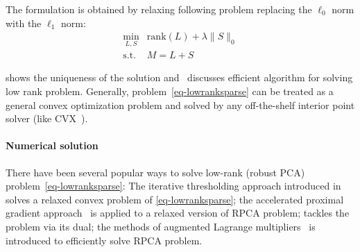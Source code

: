 The formulation is obtained by relaxing following problem replacing the $\ell_0$ norm with the $\ell_1$ norm:
\begin{equation}
\label{eq-lowrankorigin}
\begin{array}{cl}
\min_{L,S} & \mathrm{rank}(L) + \lambda \|S\|_0 \\
\mathrm{s.t.} & M = L+S
\end{array}
\end{equation}

\cite{candes2009exact,wright2009robust} shows the uniqueness of the solution and~\cite{lin2010augmented} discusses efficient algorithm for solving low rank problem.
Generally, problem~\ref{eq-lowranksparse} can be treated as a general convex optimization problem and solved by any off-the-shelf interior point solver (like CVX~\cite{grant2008cvx}).

\paragraph{Numerical solution}
There have been several popular ways to solve low-rank (robust PCA) problem~\eqref{eq-lowranksparse}:
The iterative thresholding approach introduced in~\cite{wright2009robust} solves a relaxed convex problem of \eqref{eq-lowranksparse};
the accelerated proximal gradient approach~\cite{beck2009fast} is applied to a relaxed version of RPCA problem;
\cite{lin2009fast} tackles the problem via its dual;
the methods of augmented Lagrange multipliers~\cite{lin2010augmented} is introduced to efficiently solve RPCA problem.

